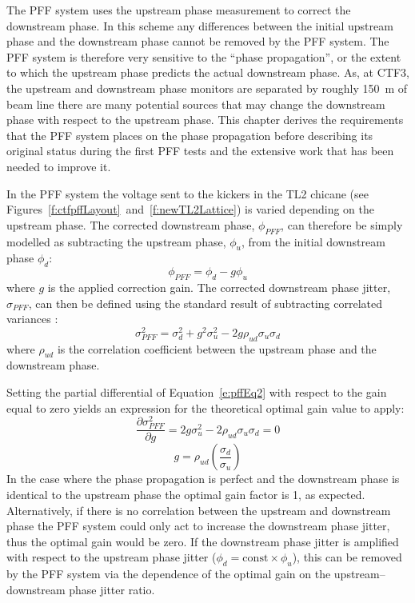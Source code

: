 
The PFF system uses the upstream phase measurement to correct the downstream phase. In this scheme any differences between the initial upstream phase and the downstream phase cannot be removed by the PFF system. The PFF system is therefore very sensitive to the ``phase propagation'', or the extent to which the upstream phase predicts the actual downstream phase. As, at CTF3, the upstream and downstream phase monitors are separated by roughly 150~m of beam line there are many potential sources that may change the downstream phase with respect to the upstream phase. This chapter derives the requirements that the PFF system places on the phase propagation before describing its original status during the first PFF tests and the extensive work that has been needed to improve it.


In the PFF system the voltage sent to the kickers in the TL2 chicane (see Figures~\ref{f:ctfpffLayout}~and~\ref{f:newTL2Lattice}) is varied depending on the upstream phase. The corrected downstream phase, \(\phi_{PFF}\), can therefore be simply modelled as subtracting the upstream phase, \(\phi_u\), from the initial downstream phase \(\phi_d\):
\begin{equation}
\phi_{PFF} = \phi_d - g\phi_u
\label{e:pffEq1}
\end{equation}
where \(g\) is the applied correction gain. The corrected downstream phase jitter, \(\sigma_{PFF}\), can then be defined using the standard result of subtracting correlated variances \cite{sumVar}:
\begin{equation}
\sigma_{PFF}^2 = \sigma_d^2 + g^2\sigma_u^2 - 2g\rho_{ud}\sigma_u\sigma_d
\label{e:pffEq2}
\end{equation}
where \(\rho_{ud}\) is the correlation coefficient between the upstream phase and the downstream phase. 

Setting the partial differential of Equation~\ref{e:pffEq2} with respect to the gain equal to zero yields an expression for the theoretical optimal gain value to apply:
\begin{equation}
\frac{\partial \sigma_{PFF}^2}{\partial g} = 2g\sigma_u^2 - 2\rho_{ud}\sigma_u\sigma_d = 0
\end{equation}
\begin{equation}
g = \rho_{ud}\left(\frac{\sigma_d}{\sigma_u}\right)
\label{e:theoretOptGain}
\end{equation}
In the case where the phase propagation is perfect and the downstream phase is identical to the upstream phase the optimal gain factor is 1, as expected. Alternatively, if there is no correlation between the upstream and downstream phase the PFF system could only act to increase the downstream phase jitter, thus the optimal gain would be zero. If the downstream phase jitter is amplified with respect to the upstream phase jitter (\(\phi_d = \mathrm{const}\times\phi_u\)), this can be removed by the PFF system via the dependence of the optimal gain on the upstream--downstream phase jitter ratio.

